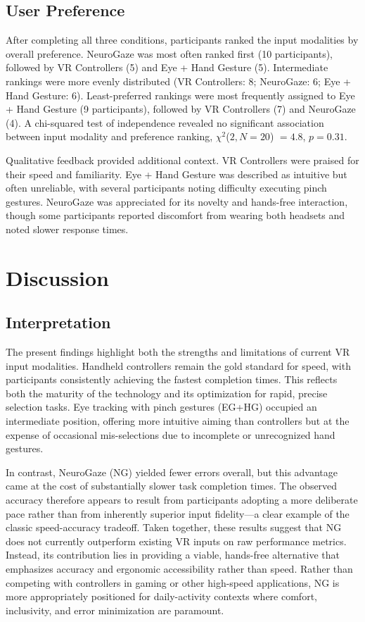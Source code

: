 \documentclass[utf8]{FrontiersinHarvard} %
\begin{document}
\subsection{User Preference}
After completing all three conditions, participants ranked the input modalities by overall preference. NeuroGaze was most often ranked first (10 participants), followed by VR Controllers (5) and Eye + Hand Gesture (5). Intermediate rankings were more evenly distributed (VR Controllers: 8; NeuroGaze: 6; Eye + Hand Gesture: 6). Least-preferred rankings were most frequently assigned to Eye + Hand Gesture (9 participants), followed by VR Controllers (7) and NeuroGaze (4). A chi-squared test of independence revealed no significant association between input modality and preference ranking, $\chi^2$($2, N = 20$) $= 4.8$, $p = 0.31$.

Qualitative feedback provided additional context. VR Controllers were praised for their speed and familiarity. Eye + Hand Gesture was described as intuitive but often unreliable, with several participants noting difficulty executing pinch gestures. NeuroGaze was appreciated for its novelty and hands-free interaction, though some participants reported discomfort from wearing both headsets and noted slower response times.

\section{Discussion}
\subsection{Interpretation}
The present findings highlight both the strengths and limitations of current VR input modalities. Handheld controllers remain the gold standard for speed, with participants consistently achieving the fastest completion times. This reflects both the maturity of the technology and its optimization for rapid, precise selection tasks. Eye tracking with pinch gestures (EG+HG) occupied an intermediate position, offering more intuitive aiming than controllers but at the expense of occasional mis-selections due to incomplete or unrecognized hand gestures.

In contrast, NeuroGaze (NG) yielded fewer errors overall, but this advantage came at the cost of substantially slower task completion times. The observed accuracy therefore appears to result from participants adopting a more deliberate pace rather than from inherently superior input fidelity—a clear example of the classic speed-accuracy tradeoff. Taken together, these results suggest that NG does not currently outperform existing VR inputs on raw performance metrics. Instead, its contribution lies in providing a viable, hands-free alternative that emphasizes accuracy and ergonomic accessibility rather than speed. Rather than competing with controllers in gaming or other high-speed applications, NG is more appropriately positioned for daily-activity contexts where comfort, inclusivity, and error minimization are paramount.
\end{document}

